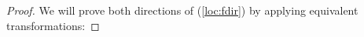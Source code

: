 \documentclass[main.tex]{subfiles}
\begin{document}
\begin{proof}
    \begin{comment}
        First, let $\eta'$ be a join of $\sigma'$ and $\tau'$ and
        $\eta''$ be a meet of $\sigma''$ and $\tau''$, e.g:

        \[
            \sigma' \less \eta', \tau' \less \eta',
                \forall \nu \in \tclos{T} (\sigma' \less \nu, \tau' \less \nu \implies \eta' \less \nu)
        \]
        \[
            \eta'' \less \sigma'', \eta'' \less \tau'',
                \forall \nu \in \tclos{T} (\nu \less \sigma'', \nu \less \tau'' \implies \nu \less \eta'')
        \]

        \begin{itemize}
            \item
                since $\sigma' \less \eta'$ and $\eta'' \less \sigma''$, we
                have that $\eta = (\eta' \tot \eta'') \less (\sigma' \tot \sigma'') = \sigma$.
            \item since $\tau' \less \eta'$ and $\eta'' \less \tau''$, we
                have that $\eta = (\eta' \tot \eta'') \less (\tau' \tot \tau'') = \tau$.
            \item let $\nu \in \tclos{T}$ be such that $\sigma \less \nu$
                and $\tau \less \nu$. This means that $\nu = \nu' \tot \nu''$
                such that $\nu' \less \sigma', \nu' \less \tau'$ and
                $\sigma'' \less \nu'', \tau'' \less \nu''$.

                But since $\eta'$ is a join of $\sigma'$ and $\tau'$, we know
                that $\eta' \less \nu'$. And dually,
                since $\eta''$ is a meet of $\sigma''$ and $\tau''$, we know
                that $\nu'' \less \eta''$.

                Then, we have that $\nu \less \eta$.
        \end{itemize}
    \end{comment}

    We will prove both directions of (\ref{loc:fdir}) by applying equivalent
    transformations:


\end{proof}
\end{document}
